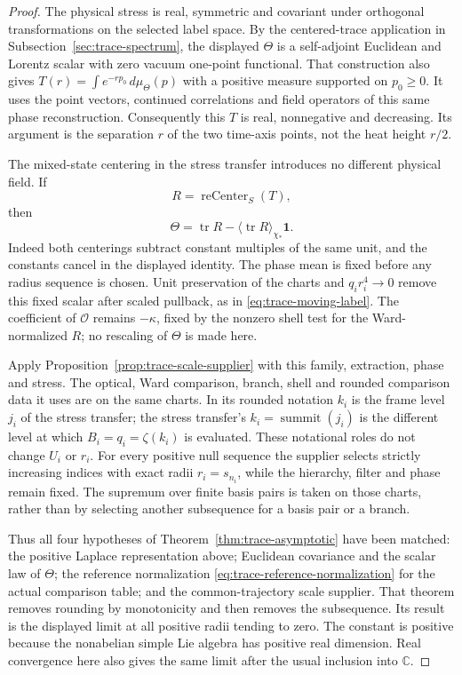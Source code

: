 \begin{proof}
The physical stress is real, symmetric and covariant under orthogonal
transformations on the selected label space. By the centered-trace
application in Subsection~\ref{sec:trace-spectrum}, the displayed $\Theta$
is a self-adjoint Euclidean and Lorentz scalar with zero vacuum
one-point functional. That construction also gives
$T(r)=\int e^{-rp_0}\,d\mu_\Theta(p)$ with a positive measure supported
on $p_0\ge0$. It uses the point vectors, continued correlations and
field operators of this same phase reconstruction. Consequently this
$T$ is real, nonnegative and decreasing. Its argument is the separation
$r$ of the two time-axis points, not the heat height $r/2$.

The mixed-state centering in the stress transfer introduces no different
physical field. If
\[
 R=\operatorname{reCenter}_S(T),
\]
then
\[
 \Theta=\operatorname{tr}R-
                  \langle\operatorname{tr}R\rangle_{\chi_*}\mathbf1.
\]
Indeed both centerings subtract constant multiples of the same unit,
and the constants cancel in the displayed identity. The phase mean
is fixed before any radius sequence is chosen. Unit preservation of
the charts and $q_ir_i^4\to0$ remove this fixed scalar after scaled
pullback, as in \eqref{eq:trace-moving-label}. The coefficient of
$\mathcal O$ remains $-\kappa$, fixed by the nonzero shell test for the
Ward-normalized $R$; no rescaling of $\Theta$ is made here.

Apply Proposition~\ref{prop:trace-scale-supplier} with this family,
extraction, phase and stress. The optical, Ward comparison, branch, shell and
rounded comparison data it uses are on the same charts. In its rounded
notation $k_i$ is the frame level $j_i$ of the stress transfer; the stress transfer's
$k_i=\operatorname{summit}(j_i)$ is the different level at which
$B_i=q_i=\zeta(k_i)$ is evaluated. These notational roles do not change
$U_i$ or $r_i$. For every positive null sequence the supplier selects
strictly increasing indices with exact radii $r_i=s_{n_i}$, while the
hierarchy, filter and phase remain fixed. The supremum over finite
basis pairs is taken on those charts, rather than by selecting another
subsequence for a basis pair or a branch.

Thus all four hypotheses of Theorem~\ref{thm:trace-asymptotic} have
been matched: the positive Laplace representation above; Euclidean
covariance and the scalar law of $\Theta$; the reference normalization
\eqref{eq:trace-reference-normalization} for the actual comparison
table; and the common-trajectory scale supplier. That theorem removes
rounding by monotonicity and then removes the subsequence. Its result
is the displayed limit at all positive radii tending to zero. The
constant is positive because the nonabelian simple Lie algebra has
positive real dimension. Real convergence here also gives the same
limit after the usual inclusion into $\mathbb C$.


\end{proof}
